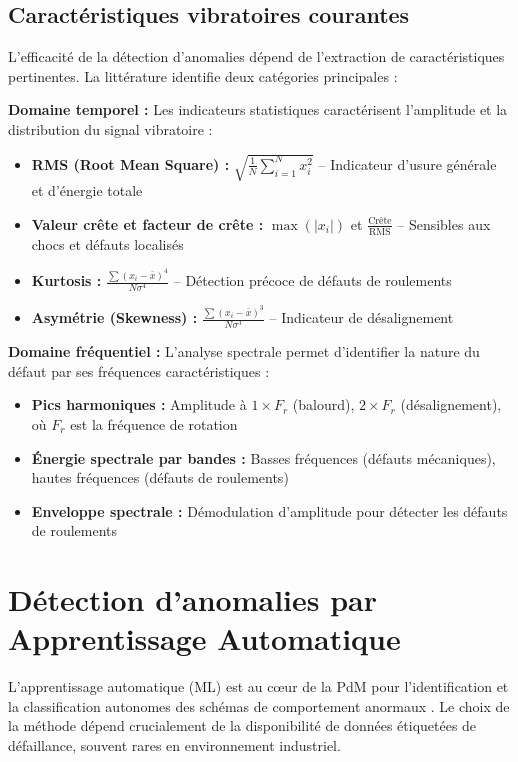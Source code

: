 \subsection{Caractéristiques vibratoires courantes}

L'efficacité de la détection d'anomalies dépend de l'extraction de caractéristiques pertinentes. La littérature identifie deux catégories principales \cite{ran2019,tiboni2022} :

\textbf{Domaine temporel :} Les indicateurs statistiques caractérisent l'amplitude et la distribution du signal vibratoire :
\begin{itemize}
\item \textbf{RMS (Root Mean Square) :} $\sqrt{\frac{1}{N}\sum_{i=1}^{N}x_i^2}$ -- Indicateur d'usure générale et d'énergie totale
\item \textbf{Valeur crête et facteur de crête :} $\max(|x_i|)$ et $\frac{\text{Crête}}{\text{RMS}}$ -- Sensibles aux chocs et défauts localisés
\item \textbf{Kurtosis :} $\frac{\sum(x_i-\bar{x})^4}{N\sigma^4}$ -- Détection précoce de défauts de roulements
\item \textbf{Asymétrie (Skewness) :} $\frac{\sum(x_i-\bar{x})^3}{N\sigma^3}$ -- Indicateur de désalignement
\end{itemize}

\textbf{Domaine fréquentiel :} L'analyse spectrale permet d'identifier la nature du défaut par ses fréquences caractéristiques :
\begin{itemize}
\item \textbf{Pics harmoniques :} Amplitude à $1 \times F_r$ (balourd), $2 \times F_r$ (désalignement), où $F_r$ est la fréquence de rotation
\item \textbf{Énergie spectrale par bandes :} Basses fréquences (défauts mécaniques), hautes fréquences (défauts de roulements)
\item \textbf{Enveloppe spectrale :} Démodulation d'amplitude pour détecter les défauts de roulements
\end{itemize}


\section{Détection d'anomalies par Apprentissage Automatique}
\label{sec:detection_anomalies}

L'apprentissage automatique (ML) est au cœur de la PdM pour l'identification et la classification autonomes des schémas de comportement anormaux \cite{achouch2022,chandola2009}. Le choix de la méthode dépend crucialement de la disponibilité de données étiquetées de défaillance, souvent rares en environnement industriel.

